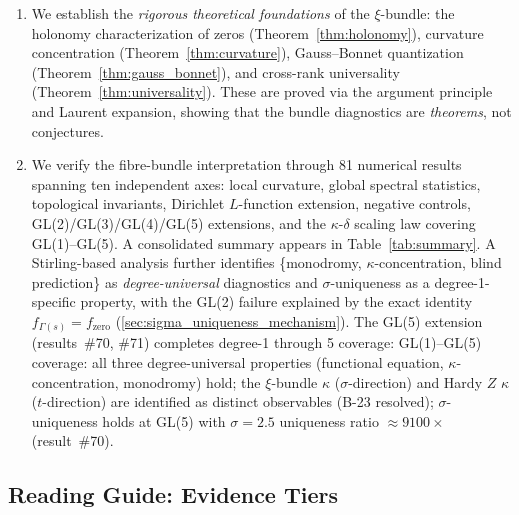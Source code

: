 \documentclass[11pt, a4paper]{article}
\theoremstyle{definition}
\theoremstyle{plain}
\newcommand{\xif}{\xi}                      %
\newcommand{\Psip}{\Psi}                    %
\begin{document}
\begin{enumerate}
        demonstrate that, with all three closed, the supervised chain
        $\arg\xif(\tfrac{1}{2}+it)\to\mathcal{L}_{\mathrm{tgt}}\to
        \hat\Psip$ is sound at off-zero sampling points
        ($p=1.18\times10^{-15}$, ratio $18.2\times$), localising the
        remaining defect to the network's output representation near
        zeros (Remark~\ref{rem:isolation}).
  \item We establish the \emph{rigorous theoretical foundations} of the
        $\xif$-bundle: the holonomy characterization of zeros
        (Theorem~\ref{thm:holonomy}), curvature concentration
        (Theorem~\ref{thm:curvature}), Gauss--Bonnet quantization
        (Theorem~\ref{thm:gauss_bonnet}), and cross-rank universality
        (Theorem~\ref{thm:universality}). These are proved via the
        argument principle and Laurent expansion, showing that the
        bundle diagnostics are \emph{theorems}, not conjectures.
  \item We verify the fibre-bundle interpretation through 81 numerical
        results spanning ten independent axes:
        local curvature, global spectral statistics, topological
        invariants, Dirichlet $L$-function extension, negative
        controls, GL(2)/GL(3)/GL(4)/GL(5) extensions, and the $\kappa$-$\delta$
        scaling law covering GL(1)--GL(5).
        A consolidated summary appears in Table~\ref{tab:summary}.
        A Stirling-based analysis further identifies \{monodromy,
        $\kappa$-concentration, blind prediction\} as
        \emph{degree-universal} diagnostics and $\sigma$-uniqueness
        as a degree-1-specific property, with the GL(2) failure explained
        by the exact identity $f_{\Gamma(s)} = f_\mathrm{zero}$
        (\cref{sec:sigma_uniqueness_mechanism}).
        The GL(5) extension (results~\#70, \#71) completes degree-1 through 5
        coverage: GL(1)--GL(5) coverage: all three degree-universal properties
        (functional equation, $\kappa$-concentration, monodromy) hold;
        the $\xi$-bundle $\kappa$ ($\sigma$-direction) and Hardy $Z$ $\kappa$
        ($t$-direction) are identified as distinct observables (B-23 resolved);
        $\sigma$-uniqueness holds at GL(5) with $\sigma = 2.5$ uniqueness ratio $\approx 9100\times$ (result~\#70).
\end{enumerate}

\subsection*{Reading Guide: Evidence Tiers}
\label{sec:tiers}
\end{document}
